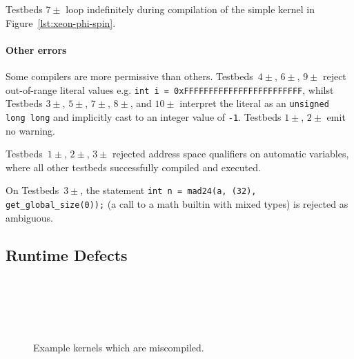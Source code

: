 Testbeds $7\pm$ loop indefinitely during compilation of the simple kernel in
Figure~\ref{lst:xeon-phi-spin}.

\paragraph{Other errors}

Some compilers are more permissive than others. Testbeds~$4\pm$, $6\pm$, $9\pm$
reject out-of-range literal values e.g. \texttt{int i =
0xFFFFFFFFFFFFFFFFFFFFFFFF}, whilst Testbeds $3\pm$, $5\pm$, $7\pm$, $8\pm$, and
$10\pm$ interpret the literal as an \texttt{unsigned long long} and implicitly
cast to an integer value of \texttt{-1}. Testbeds $1\pm$, $2\pm$ emit no
warning.

Testbeds~$1\pm$, $2\pm$, $3\pm$ rejected address space qualifiers on automatic
variables, where all other testbeds successfully compiled and executed.

On Testbeds~$3\pm$, the statement \texttt{int n = mad24(a, (32),
get\_global\_size(0));} (a call to a math builtin with mixed types) is rejected
as ambiguous.

\subsection{Runtime Defects}%
\label{subsec:runtime-defects}

\begin{figure}
  \centering %
  \\%
  \\%
  \\%
  \\%
  \caption{Example kernels which are miscompiled.}%
\end{figure}

